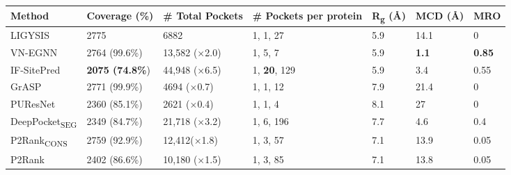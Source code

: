 \begin{landscape}
\begin{longtable}[c]{|M{28mm}|M{29mm}|M{29mm}|M{41mm}|M{26mm}|M{26mm}|M{20mm}|}
\hline
\textbf{Method}        & \textbf{Coverage (\%)}    & \textbf{\# Total Pockets}  & \textbf{\# Pockets per protein} & \textbf{R\textsubscript{g} (\AA{})} & \textbf{MCD (\AA{})} & \textbf{MRO}  \\ \hline
\endfirsthead
%
\endhead
%
LIGYSIS       & 2775          & 6882          & 1, 1, 27            & 5.9                              & 14.1                         & 0    \\ \hline
VN-EGNN       & 2764 (99.6\%)   & 13,582 ($\times$2.0) & 1, 5, 7             & 5.9                              & \textbf{1.1}                          & \textbf{0.85} \\ \hline
IF-SitePred   & \textbf{2075 (74.8\%}) & 44,948 ($\times$6.5) & 1, \textbf{20}, 129          & 5.9                              & 3.4                          & 0.55 \\ \hline
GrASP         & 2771 (99.9\%) & 4694 ($\times$0.7)  & 1, 1, 12            & 7.9                              & 21.4                         & 0    \\ \hline
PUResNet      & 2360 (85.1\%) & 2621 ($\times$0.4)  & 1, 1, 4             & 8.1                              & 27                           & 0    \\ \hline
DeepPocket\textsubscript{SEG} & 2349 (84.7\%) & 21,718 ($\times$3.2) & 1, 6, 196           & 7.7                              & 4.6                          & 0.4  \\ \hline
P2Rank\textsubscript{CONS}    & 2759 (92.9\%) & 12,412($\times$1.8)  & 1, 3, 57            & 7.1                              & 13.9                         & 0.05 \\ \hline
P2Rank        & 2402 (86.6\%) & 10,180 ($\times$1.5) & 1, 3, 85            & 7.1                              & 13.8                         & 0.05 \\ \hline

\end{longtable}
\end{landscape}
